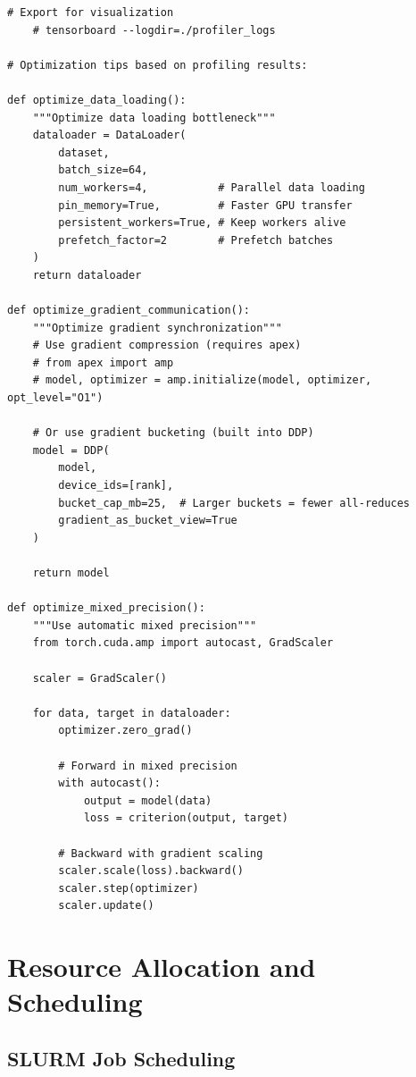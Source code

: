 \begin{lstlisting}[style=python, caption=Bottleneck detection and optimization]
    # Export for visualization
    # tensorboard --logdir=./profiler_logs

# Optimization tips based on profiling results:

def optimize_data_loading():
    """Optimize data loading bottleneck"""
    dataloader = DataLoader(
        dataset,
        batch_size=64,
        num_workers=4,           # Parallel data loading
        pin_memory=True,         # Faster GPU transfer
        persistent_workers=True, # Keep workers alive
        prefetch_factor=2        # Prefetch batches
    )
    return dataloader

def optimize_gradient_communication():
    """Optimize gradient synchronization"""
    # Use gradient compression (requires apex)
    # from apex import amp
    # model, optimizer = amp.initialize(model, optimizer, opt_level="O1")

    # Or use gradient bucketing (built into DDP)
    model = DDP(
        model,
        device_ids=[rank],
        bucket_cap_mb=25,  # Larger buckets = fewer all-reduces
        gradient_as_bucket_view=True
    )

    return model

def optimize_mixed_precision():
    """Use automatic mixed precision"""
    from torch.cuda.amp import autocast, GradScaler

    scaler = GradScaler()

    for data, target in dataloader:
        optimizer.zero_grad()

        # Forward in mixed precision
        with autocast():
            output = model(data)
            loss = criterion(output, target)

        # Backward with gradient scaling
        scaler.scale(loss).backward()
        scaler.step(optimizer)
        scaler.update()
\end{lstlisting}

\section{Resource Allocation and Scheduling}

\subsection{SLURM Job Scheduling}

